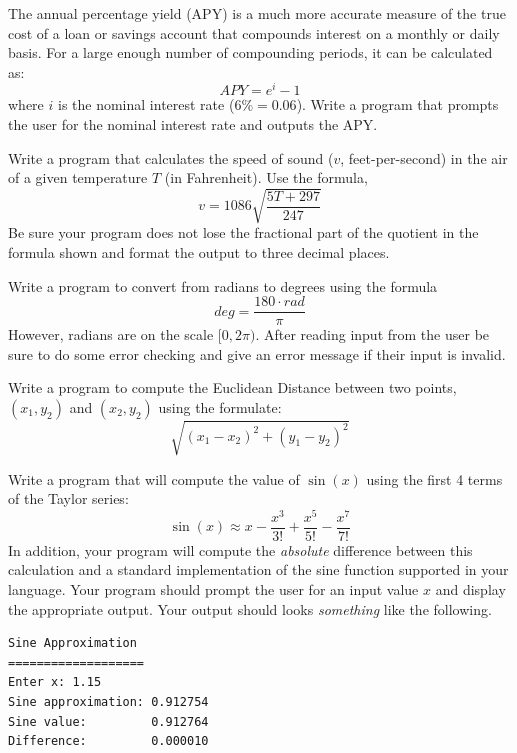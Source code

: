 \begin{exer}
The annual percentage yield (APY) is a much more accurate measure of the true cost of a 
loan or savings account that compounds interest on a monthly or daily basis.  For a large enough 
number of compounding periods, it can be calculated as:
 $$APY = e^{i} - 1$$
where $i$ is the nominal interest rate ($6\% = 0.06$).  Write a program that prompts the user 
for the nominal interest rate and outputs the APY.
\end{exer}

\begin{exer}
Write a program that calculates the speed of sound ($v$, feet-per-second) in the 
air of a given temperature $T$ (in Fahrenheit). Use the formula,
 $$v = 1086 \sqrt{\frac{5T + 297}{247}}$$
Be sure your program does not lose the fractional part of the quotient
in the formula shown and format the output to three decimal places.
\end{exer}

\begin{exer}
\label{exercise:radiansToDegree}
Write a program to convert from radians to degrees using the formula
  $$deg = \frac{180\cdot rad}{\pi}$$
However, radians are on the scale $[0, 2\pi)$.  After reading input
from the user be sure to do some error checking and give an error
message if their input is invalid.
\end{exer}

\begin{exer}
Write a program to compute the Euclidean Distance between two points, 
$(x_1, y_2)$ and $(x_2, y_2)$ using the formulate:
$$\sqrt{(x_1-x_2)^2+(y_1-y_2)^2}$$
\end{exer}

\begin{exer}
Write a program that will compute the value of $\sin(x)$ using the first 4 terms of 
the Taylor series:
  $$\sin(x) \approx x - \frac{x^3}{3!} + \frac{x^5}{5!} - \frac{x^7}{7!}$$
In addition, your program will compute the \emph{absolute} difference between this 
calculation and a standard implementation of the sine function supported in
your language.  Your program should prompt the user for an
input value $x$ and display the appropriate output.  Your output should looks \emph{something}
like the following.

\begin{verbatim}
Sine Approximation
===================
Enter x: 1.15
Sine approximation: 0.912754
Sine value:         0.912764
Difference:         0.000010
\end{verbatim}
\end{exer}

